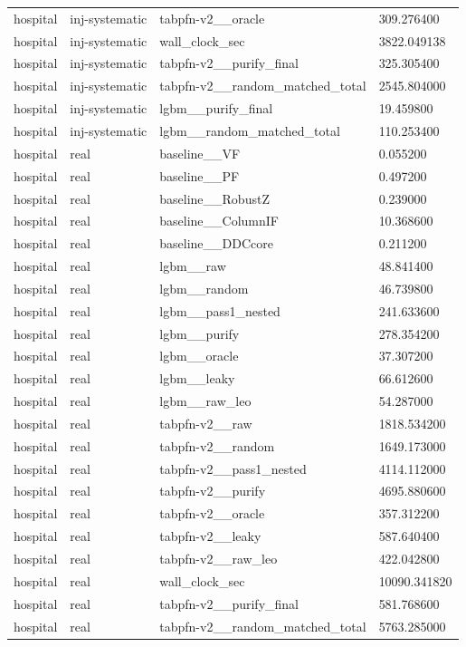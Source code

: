 \begin{tabular}{llll}
hospital & inj-systematic & tabpfn-v2\_\_oracle & 309.276400 \\
hospital & inj-systematic & wall\_clock\_sec & 3822.049138 \\
hospital & inj-systematic & tabpfn-v2\_\_purify\_final & 325.305400 \\
hospital & inj-systematic & tabpfn-v2\_\_random\_matched\_total & 2545.804000 \\
hospital & inj-systematic & lgbm\_\_purify\_final & 19.459800 \\
hospital & inj-systematic & lgbm\_\_random\_matched\_total & 110.253400 \\
hospital & real & baseline\_\_VF & 0.055200 \\
hospital & real & baseline\_\_PF & 0.497200 \\
hospital & real & baseline\_\_RobustZ & 0.239000 \\
hospital & real & baseline\_\_ColumnIF & 10.368600 \\
hospital & real & baseline\_\_DDCcore & 0.211200 \\
hospital & real & lgbm\_\_raw & 48.841400 \\
hospital & real & lgbm\_\_random & 46.739800 \\
hospital & real & lgbm\_\_pass1\_nested & 241.633600 \\
hospital & real & lgbm\_\_purify & 278.354200 \\
hospital & real & lgbm\_\_oracle & 37.307200 \\
hospital & real & lgbm\_\_leaky & 66.612600 \\
hospital & real & lgbm\_\_raw\_leo & 54.287000 \\
hospital & real & tabpfn-v2\_\_raw & 1818.534200 \\
hospital & real & tabpfn-v2\_\_random & 1649.173000 \\
hospital & real & tabpfn-v2\_\_pass1\_nested & 4114.112000 \\
hospital & real & tabpfn-v2\_\_purify & 4695.880600 \\
hospital & real & tabpfn-v2\_\_oracle & 357.312200 \\
hospital & real & tabpfn-v2\_\_leaky & 587.640400 \\
hospital & real & tabpfn-v2\_\_raw\_leo & 422.042800 \\
hospital & real & wall\_clock\_sec & 10090.341820 \\
hospital & real & tabpfn-v2\_\_purify\_final & 581.768600 \\
hospital & real & tabpfn-v2\_\_random\_matched\_total & 5763.285000 \\

\end{tabular}
